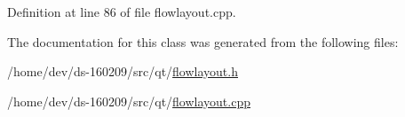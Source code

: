 Definition at line 86 of file flowlayout.\+cpp.



The documentation for this class was generated from the following files\+:\begin{DoxyCompactItemize}
\item 
/home/dev/ds-\/160209/src/qt/\hyperlink{flowlayout_8h}{flowlayout.\+h}\item 
/home/dev/ds-\/160209/src/qt/\hyperlink{flowlayout_8cpp}{flowlayout.\+cpp}\end{DoxyCompactItemize}
